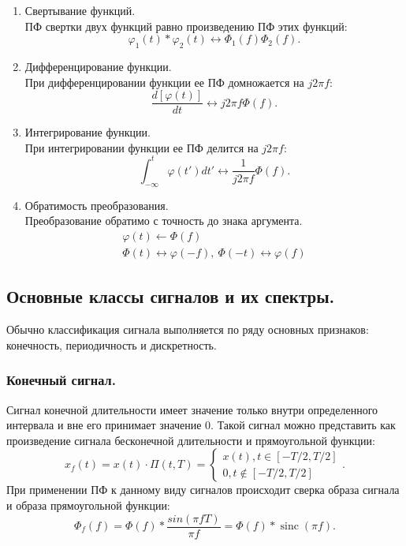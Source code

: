 \documentclass[a4paper,14pt]{extarticle}
\DeclareMathOperator{\sinc}{sinc}
\begin{document}
\begin{enumerate}
\item Свертывание функций. \\ ПФ свертки двух функций равно произведению ПФ этих функций:
\begin{equation*}
\varphi_1(t) * \varphi_2(t) \leftrightarrow  \Phi_1(f)  \Phi_2(f).
\end{equation*}

\item Дифференцирование функции. \\ При дифференцировании функции ее ПФ домножается на $j 2 \pi f$:
\begin{equation*}
\frac{d[\varphi(t)]}{dt} \leftrightarrow j 2 \pi f \Phi (f).
\end{equation*}

\item Интегрирование функции. \\ При интегрировании функции ее ПФ делится на $j 2 \pi f$:
\begin{equation*}
\int_{-\infty}^{t} \varphi(t') dt' \leftrightarrow \frac{1}{j 2 \pi f} \Phi (f).
\end{equation*}

\item Обратимость преобразования. \\ Преобразование обратимо с точность до знака аргумента. 
\begin{gather*}
\varphi(t) \leftarrow \Phi (f) \\ \Phi(t) \leftrightarrow \varphi (-f), ~ \Phi(-t) \leftrightarrow \varphi(f)
\end{gather*}

\end{enumerate}  


\subsection{Основные классы сигналов и их спектры.}

Обычно классификация сигнала выполняется по ряду основных признаков: конечность, периодичность и дискретность.

\subsubsection{Конечный сигнал.}

Сигнал конечной длительности имеет значение только внутри определенного интервала и вне его принимает значение 0. Такой сигнал можно представить как произведение сигнала бесконечной длительности и прямоугольной функции:
\begin{equation*}
x_f (t) = x(t) \cdot \Pi(t, T) = \begin{cases} x(t), t \in [-T/2, T/2] \\ 0, t \notin  [-T/2, T/2] \end{cases}.
\end{equation*}
При применении ПФ к данному виду сигналов происходит сверка образа сигнала и образа прямоугольной функции:
\begin{equation*}
\Phi_f(f) = \Phi(f) * \frac{sin(\pi f T)}{\pi f} = \Phi(f) * \sinc(\pi f).
\end{equation*}
\end{document}
